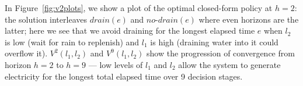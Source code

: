 In Figure~\ref{fig:v2plots}, we show a plot of 
the optimal closed-form policy
at $h=2$: the solution interleaves $\mathit{drain}(e)$ and 
$\mathit{no}$-$\mathit{drain}(e)$ where even horizons are the latter;
here we see that we avoid draining for the longest elapsed time $e$ 
when $l_2$ is low (wait for rain to replenish) and $l_1$ is high (draining
water into it could overflow it).  $V^2(l_1,l_2)$ and $V^9(l_1,l_2)$
show the progression of convergence from horizon $h=2$ to $h=9$ ---
low levels of $l_1$ and $l_2$ allow the system to generate electricity
for the longest total elapsed time over 9 decision stages.




%

